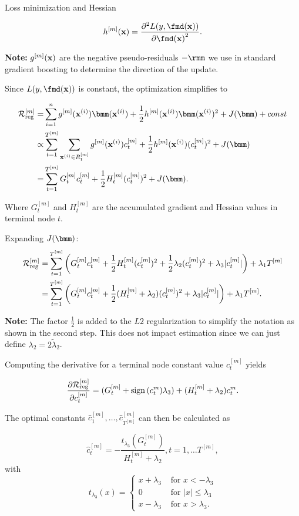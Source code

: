 \begin{vbframe}{Loss minimization}
and Hessian

$$
h^{[m]}(\xv) = \frac{\partial^2 L(y, \fmd(\xv))}{\partial {\fmd(\xv)}^2}.
$$

\textbf{Note:} $g^{[m]}(\mathbf{x})$ are the negative pseudo-residuals $-\rmm$ we use in standard gradient boosting to determine the direction of the update.

\framebreak

Since $L(y, \fmd(\xv))$ is constant, the optimization simplifies to

\begin{align*}
\riskr^{[m]} = &\sum_{i = 1}^n g^{[m]}(\xi)\bmm(\xi) + \frac12 h^{[m]}(\xi)\bmm(\xi)^2 + J(\bmm) + const\\
\propto&\sum_{t=1}^{T^{[m]}}\sum_{\xi\in R_t^{[m]}} g^{[m]}(\xi)c^{[m]}_t + \frac12 h^{[m]}(\xi)(c^{[m]}_t)^2 + J(\bmm) \\
=& \sum_{t=1}^{T^{[m]}}G^{[m]}_t c^{[m]}_t+\frac12 H^{[m]}_t (c^{[m]}_t)^2 + J(\bmm).
\end{align*}

Where $G^{[m]}_t$ and $H^{[m]}_t$ are the accumulated gradient and Hessian values in terminal node $t$.



\framebreak

Expanding $J(\bmm)$:
\begin{align*}
\mathcal{R}_{\text{reg}}^{[m]} = &\sum_{t=1}^{T^{[m]}}\left(G^{[m]}_t c^{[m]}_t+\frac12 H^{[m]}_t (c^{[m]}_t)^2 + \frac12\lambda_2(c^{[m]}_t)^2 + \lambda_3 |c^{[m]}_t|\right) + \lambda_1 T^{[m]}\\
=&\sum_{t=1}^{T^{[m]}}\left(G^{[m]}_t c^{[m]}_t+\frac12 (H^{[m]}_t + \lambda_2) (c^{[m]}_t)^2 + \lambda_3 |c_t^{[m]}|\right) + \lambda_1 T^{[m]}.
\end{align*}

\lz

\textbf{Note:} The factor $\frac12$ is added to the $L2$ regularization to simplify the notation as shown in the second step.
This does not impact estimation since we can just define $\lambda_2 = 2\tilde\lambda_2$.

\framebreak

Computing the derivative for a terminal node constant value $c^{[m]}_t$ yields

$$
\frac{\partial \mathcal{R}_{\text{reg}}^{[m]}}{\partial c^{[m]}_t} = (G^{[m]}_t + \operatorname{sign}{(c^{m}_t)}\lambda_3) + (H^{[m]}_t + \lambda_2) c^{m}_t.
$$

The optimal constants $\hat{c}^{[m]}_1,\dots, \hat{c}^{[m]}_{T^{[m]}}$ can then be calculated as

\lz
$$
\hat{c}^{[m]}_t = - \frac{t_{\lambda_3}\left(G^{[m]}_t\right)}{H^{[m]}_t + \lambda_2}, t=1,\dots T^{[m]},
$$
with $$t_{\lambda_3}(x) = \begin{cases}
  x + \lambda_3 &\text{ for } x < - \lambda_3 \\
  0  &\text{ for } |x| \leq \lambda_3 \\
  x - \lambda_3 &\text{ for } x > \lambda_3.
\end{cases}$$

\end{vbframe}

